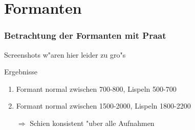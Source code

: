 \documentclass[11pt]{beamer}
\begin{document}
\section{Formanten}

\begin{frame}
\frametitle{Betrachtung der Formanten mit Praat}
Screenshots w"aren hier leider zu gro"s
\begin{block}{Ergebnisse}
\begin{enumerate}
\item Formant normal zwischen 700-800, Lispeln 500-700
\item Formant normal zwischen 1500-2000, Lispeln 1800-2200
\item[$\Rightarrow$] Schien konsistent "uber alle Aufnahmen
\end{enumerate}
\end{block}
\end{frame}
\end{document}
